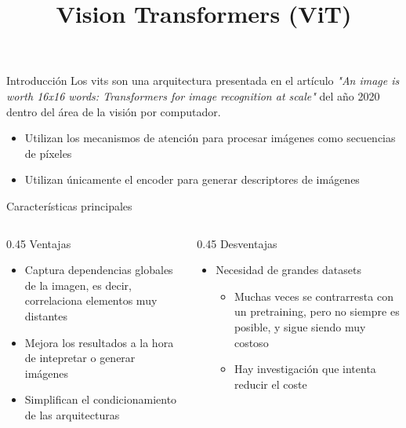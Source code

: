 



\newcommand{\mytitle}{Vision Transformers (ViT)}
\title{\mytitle}


\maketitle

\begin{frame}{Introducción}
Los \glspl{vit} son una arquitectura presentada en el artículo \textit{"An image is worth 16x16 words: Transformers for image recognition at scale"} del año 2020 \cite{dosovitskiy2020image} dentro del área de la \alert{visión por computador}.

\begin{itemize}
    \item Utilizan los mecanismos de \alert{atención} para procesar imágenes como \alert{secuencias de píxeles}
    \item Utilizan únicamente el \alert{encoder} para generar \alert{descriptores} de imágenes
\end{itemize}
\end{frame}

\begin{frame}{Características principales}
\begin{columns}[c]
\centering
\begin{column}{0.45\textwidth}
\alert{\Large Ventajas}
\begin{itemize}
    \item Captura \alert{dependencias globales} de la imagen, es decir, correlaciona elementos muy distantes
    \item Mejora los resultados a la hora de intepretar o generar imágenes
    \item Simplifican el \alert{condicionamiento} de las arquitecturas
\end{itemize}
\end{column}
\centering
\begin{column}{0.45\textwidth}
\alert{\Large Desventajas}
\begin{itemize}
    \item Necesidad de \alert{grandes datasets}\footnotemark
    \begin{itemize}
        \item Muchas veces se contrarresta con un \alert{pretraining}, pero no siempre es posible, y sigue siendo muy costoso
        \item Hay investigación que intenta reducir el coste \cite{yuan2021tokens}
    \end{itemize}
\end{itemize}
\end{column}
\end{columns}

\end{frame}

